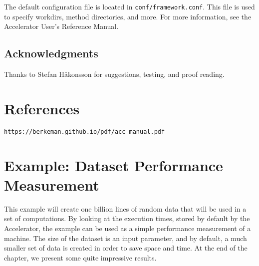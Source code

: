 \documentclass[a4paper]{article}
\begin{document}
The default configuration file is located in
\texttt{conf/framework.conf}.  This file is used to specify workdirs,
method directories, and more.  For more information, see the
Accelerator User's Reference Manual.


\vfill
\subsection*{Acknowledgments}
Thanks to Stefan H{\aa}konsson for suggestions, testing, and proof reading.


\section*{References}
\texttt{https://berkeman.github.io/pdf/acc\_manual.pdf}



\clearpage
\section*{Example:  Dataset Performance Measurement}
\label{example:datasetperf}

\begin{figure}[h]\centering
  
  \label{fig:ex2}
\end{figure}

This example will create one billion lines of random data that will be
used in a set of computations.  By looking at the execution times,
stored by default by the Accelerator, the example can be used as a
simple performance measurement of a machine.  The size of the dataset
is an input parameter, and by default, a much smaller set of data is
created in order to save space and time.  At the end of the chapter,
we present some quite impressive results.
\end{document}

